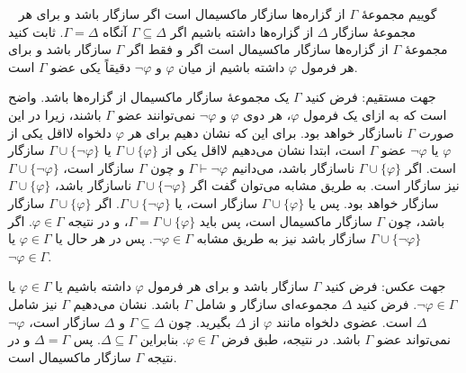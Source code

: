 ~
گوییم مجموعهٔ
$\Gamma$
از گزاره‌ها
سازگار ماکسیمال است اگر سازگار باشد و برای هر مجموعهٔ سازگار
$\Delta$
از گزاره‌ها داشته باشیم اگر
$\Gamma\subseteq\Delta$
آنگاه
$\Gamma=\Delta$. ثابت کنید مجموعهٔ
$\Gamma$
از گزاره‌ها سازگار ماکسیمال است اگر و فقط اگر
{\color{red} $\Gamma$ سازگار باشد و }
برای هر فرمول
$\varphi$
داشته باشیم از میان
$\varphi$
و
$\neg\varphi$
دقیقاً یکی عضو
$\Gamma$
است.
\begin{ans}
  جهت مستقیم: فرض کنید $\Gamma$ یک مجموعهٔ سازگار ماکسیمال از گزاره‌ها باشد. واضح است که به ازای یک فرمول $\varphi$، هر دوی $\varphi$ و $\neg \varphi$ نمی‌توانند عضو $\Gamma$ باشند، زیرا در این صورت $\Gamma$ ناسازگار خواهد بود. برای این که نشان دهیم برای هر $\varphi$ دلخواه لااقل یکی از $\varphi$ یا $\neg \varphi$ عضو $\Gamma$ است، ابتدا نشان می‌دهیم لااقل یکی از $\Gamma \cup \{\varphi\}$ یا $\Gamma \cup \{\neg \varphi\}$ سازگار است. اگر $\Gamma \cup \{\varphi\}$ ناسازگار باشد، می‌دانیم $\Gamma \vdash \neg \varphi$ و چون $\Gamma$ سازگار است، $\Gamma \cup \{\neg \varphi\}$ نیز سازگار است. به طریق مشابه می‌توان گفت اگر $\Gamma \cup \{\neg \varphi\}$ ناسازگار باشد، $\Gamma \cup \{\varphi\}$ سازگار خواهد بود. پس یا $\Gamma \cup \{\varphi\}$ سازگار است، یا $\Gamma \cup \{\neg \varphi\}$. اگر $\Gamma \cup \{\varphi\}$ سازگار باشد، چون $\Gamma$ سازگار ماکسیمال است، پس باید $\Gamma = \Gamma \cup \{\varphi\}$، و در نتیجه $\varphi \in \Gamma$. اگر $\Gamma \cup \{\neg \varphi\}$ سازگار باشد نیز به طریق مشابه $\neg \varphi \in \Gamma$. پس در هر حال یا $\varphi \in \Gamma$ یا $\neg \varphi \in \Gamma$.

  جهت عکس: فرض کنید $\Gamma$ سازگار باشد و برای هر فرمول $\varphi$ داشته باشیم یا $\varphi \in \Gamma$ یا $\neg \varphi \in \Gamma$. فرض کنید $\Delta$ مجموعه‌ای سازگار و شامل $\Gamma$ باشد. نشان می‌دهیم $\Gamma$ نیز شامل $\Delta$ است. عضوی دلخواه مانند $\varphi$ از $\Delta$ بگیرید. چون $\Gamma \subseteq \Delta$ و $\Delta$ سازگار است، $\neg \varphi$ نمی‌تواند عضو $\Gamma$ باشد. در نتیجه، طبق فرض $\varphi \in \Gamma$. بنابراین $\Delta \subseteq \Gamma$. پس $\Delta = \Gamma$ و در نتیجه $\Gamma$ سازگار ماکسیمال است.
\end{ans}